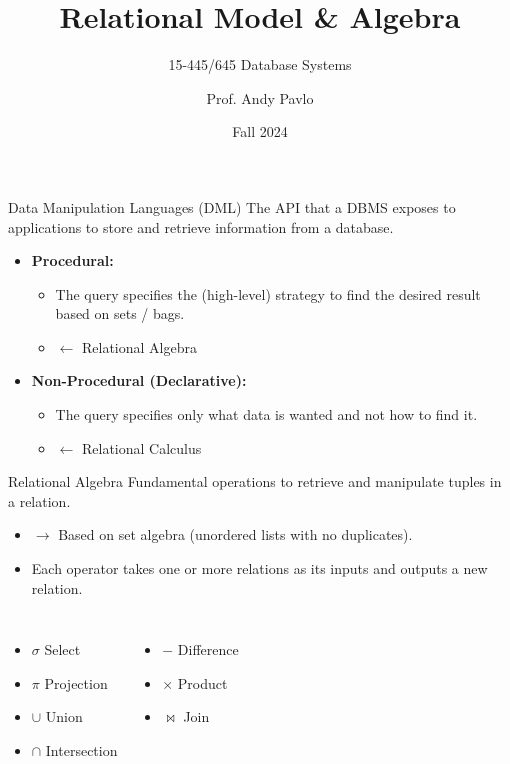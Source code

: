 \documentclass[aspectratio=169, 10pt]{beamer}
\title{Relational Model \& Algebra}
\subtitle{15-445/645 Database Systems}
\author{Prof. Andy Pavlo}
\institute{Carnegie Mellon University}
\date{Fall 2024}
\begin{document}
\begin{frame}{Data Manipulation Languages (DML)}
    The API that a DBMS exposes to applications to store and retrieve information from a database.
    \vspace{1em}
    \begin{itemize}
        \item \textbf{Procedural:}
        \begin{itemize}
            \item The query specifies the (high-level) strategy to find the desired result based on sets / bags.
            \item $\leftarrow$ Relational Algebra
        \end{itemize}
        \item \textbf{Non-Procedural (Declarative):}
        \begin{itemize}
            \item The query specifies only what data is wanted and not how to find it.
            \item $\leftarrow$ Relational Calculus
        \end{itemize}
    \end{itemize}
\end{frame}

\begin{frame}{Relational Algebra}
    Fundamental operations to retrieve and manipulate tuples in a relation.
    \begin{itemize}
        \item $\rightarrow$ Based on set algebra (unordered lists with no duplicates).
        \item Each operator takes one or more relations as its inputs and outputs a new relation. 
    \end{itemize}
    \vspace{1em}
    \begin{columns}
        \begin{itemize}
            \item $\sigma$ Select
            \item $\pi$ Projection
            \item $\cup$ Union
            \item $\cap$ Intersection
        \end{itemize}
        \begin{itemize}
            \item $-$ Difference
            \item $\times$ Product
            \item $\bowtie$ Join
        \end{itemize}
    \end{columns}
\end{frame}
\end{document}
